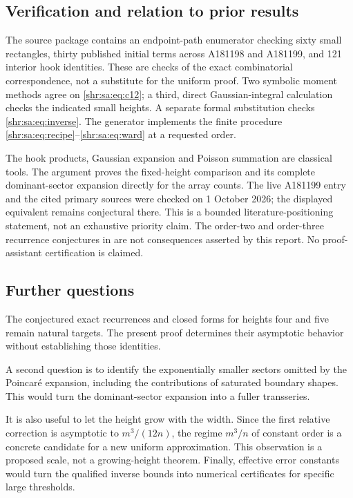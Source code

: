\documentclass[11pt,letterpaper]{article}
\numberwithin{equation}{section}
\theoremstyle{definition}
\newcommand{\1}{\mathbf 1}
\begin{document}
\subsection{Verification and relation to prior results}
The source package contains an endpoint-path enumerator checking sixty small rectangles, thirty published initial terms across A181198 and A181199, and 121 interior hook identities. These are checks of the exact combinatorial correspondence, not a substitute for the uniform proof. Two symbolic moment methods agree on \eqref{shr:sa:eq:c12}; a third, direct Gaussian-integral calculation checks the indicated small heights. A separate formal substitution checks \eqref{shr:sa:eq:inverse}. The generator implements the finite procedure \eqref{shr:sa:eq:recipe}--\eqref{shr:sa:eq:ward} at a requested order.

The hook products, Gaussian expansion and Poisson summation are classical tools. The argument proves the fixed-height comparison and its complete dominant-sector expansion directly for the array counts. The live A181199 entry and the cited primary sources were checked on 1 October 2026; the displayed equivalent remains conjectural there. This is a bounded literature-positioning statement, not an exhaustive priority claim. The order-two and order-three recurrence conjectures in \cite{KK} are not consequences asserted by this report. No proof-assistant certification is claimed.

\subsection{Further questions}
The conjectured exact recurrences and closed forms for heights four and five remain natural targets. The present proof determines their asymptotic behavior without establishing those identities.

A second question is to identify the exponentially smaller sectors omitted by the Poincar\'e expansion, including the contributions of saturated boundary shapes. This would turn the dominant-sector expansion into a fuller transseries.

It is also useful to let the height grow with the width. Since the first relative correction is asymptotic to $m^3/(12n)$, the regime $m^3/n$ of constant order is a concrete candidate for a new uniform approximation. This observation is a proposed scale, not a growing-height theorem. Finally, effective error constants would turn the qualified inverse bounds into numerical certificates for specific large thresholds.
\end{document}
